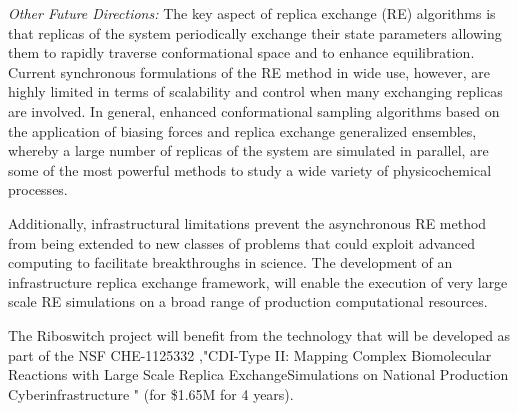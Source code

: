 \documentclass[a4paper,11pt]{article}
\newcommand{\up}{\vspace*{-1em}}
\begin{document}

{\it Other Future Directions:} The key aspect of replica exchange (RE) algorithms is that replicas of the system periodically exchange their state parameters allowing them to rapidly traverse conformational space and to enhance equilibration. Current synchronous formulations of the RE method in wide use, however, are highly limited in terms of scalability and control when many exchanging replicas are involved.  In general, enhanced conformational sampling algorithms based on the application of biasing forces and replica exchange generalized ensembles, whereby a large number of replicas of the system are simulated in parallel, are some of the most powerful methods to study a wide variety of physicochemical processes.

Additionally, infrastructural limitations prevent the asynchronous RE method from being extended to new classes of problems that could exploit advanced computing to facilitate breakthroughs in science. The development of an infrastructure replica exchange framework, will enable the execution of very large scale RE simulations on a broad range of production computational resources.

The Riboswitch project will benefit from the technology that will be developed as part of the NSF CHE-1125332 ,"CDI-Type II: Mapping Complex Biomolecular Reactions with Large Scale Replica ExchangeSimulations on National Production Cyberinfrastructure " (for \$1.65M for 4 years).

\end{document}
